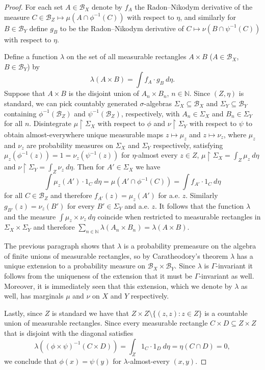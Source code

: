 \documentclass[12pt]{amsart}
\theoremstyle{definition}
\newcommand\bN{{\mathbb N}}
\begin{document}
\begin{proof}
	For each set $A \in \mathcal{B}_X$ denote by $f_A$ the Radon--Nikodym derivative of the measure $C \in \mathcal{B}_Z \mapsto \mu(A \cap \phi^{-1}(C))$ with respect to $\eta$, and similarly for $B \in \mathcal{B}_Y$ define $g_B$ to be the Radon--Nikodym derivative of $C \mapsto \nu(B \cap \psi^{-1}(C))$ with respect to $\eta$.
	
	Define a function $\lambda$ on the set of all measurable rectangles $A \times B$ ($A \in \mathcal{B}_X$, $B \in \mathcal{B}_Y$) by
	$$\lambda(A \times B) = \int f_A \cdot g_B \ d \eta.$$
	Suppose that $A \times B$ is the disjoint union of $A_n \times B_n$, $n \in \bN$. Since $(Z, \eta)$ is standard, we can pick countably generated $\sigma$-algebras $\Sigma_X \subseteq \mathcal{B}_X$ and $\Sigma_Y \subseteq \mathcal{B}_Y$ containing $\phi^{-1}(\mathcal{B}_Z)$ and $\psi^{-1}(\mathcal{B}_Z)$, respectively, with $A_n \in \Sigma_X$ and $B_n \in \Sigma_Y$ for all $n$. Disintegrate $\mu \restriction \Sigma_X$ with respect to $\phi$ and $\nu \restriction \Sigma_Y$ with respect to $\psi$ to obtain almost-everywhere unique measurable maps $z \mapsto \mu_z$ and $z \mapsto \nu_z$, where $\mu_z$ and $\nu_z$ are probability measures on $\Sigma_X$ and $\Sigma_Y$ respectively, satisfying $\mu_z(\phi^{-1}(z)) = 1 = \nu_z(\psi^{-1}(z))$ for $\eta$-almost every $z \in Z$, $\mu \restriction \Sigma_X = \int_Z \mu_z \ d \eta$ and $\nu \restriction \Sigma_Y = \int_Z \nu_z \ d \eta$. Then for $A' \in \Sigma_X$ we have
	$$\int \mu_z(A') \cdot 1_C \ d \eta = \mu(A' \cap \phi^{-1}(C)) = \int f_{A'} \cdot 1_C \ d \eta$$
	for all $C \in \mathcal{B}_Z$ and therefore $f_{A'}(z) = \mu_z(A')$ for a.e. $z$. Similarly $g_{B'}(z) = \nu_z(B')$ for every $B' \in \Sigma_Y$ and a.e. $z$. It follows that the function $\lambda$ and the measure $\int \mu_z \times \nu_z \ d \eta$ coincide when restricted to measurable rectangles in $\Sigma_X \times \Sigma_Y$ and therefore $\sum_{n \in \bN} \lambda(A_n \times B_n) = \lambda(A \times B)$.
	
	The previous paragraph shows that $\lambda$ is a probability premeasure on the algebra of finite unions of measurable rectangles, so by Caratheodory's theorem $\lambda$ has a unique extension to a probability measure on $\mathcal{B}_X \times \mathcal{B}_Y$. Since $\lambda$ is $\Gamma$-invariant it follows from the uniqueness of the extension that it must be $\Gamma$-invariant as well. Moreover, it is immediately seen that this extension, which we denote by $\lambda$ as well, has marginals $\mu$ and $\nu$ on $X$ and $Y$ respectively. 
	
	Lastly, since $Z$ is standard we have that $Z \times Z \setminus \{(z,z) : z \in Z\}$ is a countable union of measurable rectangles. Since every measurable rectangle $C \times D \subseteq Z \times Z$ that is disjoint with the diagonal satisfies
	$$\lambda((\phi \times \psi)^{-1}(C \times D)) = \int_Z 1_C \cdot 1_D \ d \eta = \eta(C \cap D) = 0,$$
	we conclude that $\phi(x) = \psi(y)$ for $\lambda$-almost-every $(x,y)$.	
\end{proof}
\end{document}
